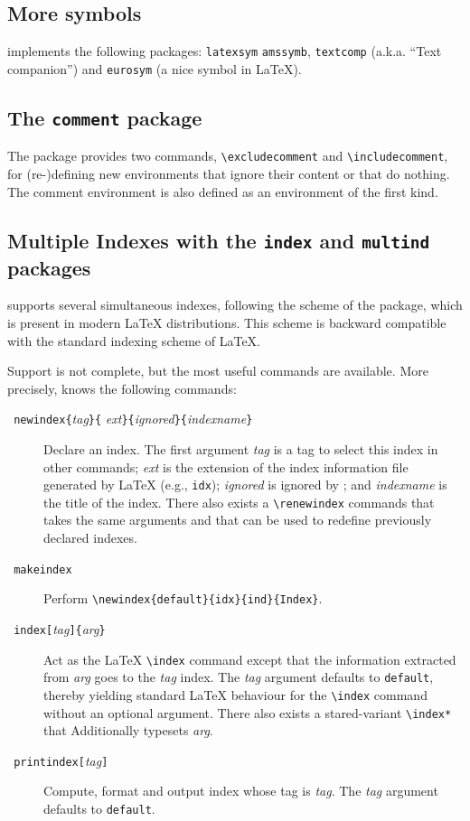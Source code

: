\subsection{More symbols}
\hevea{} implements the following packages: \texttt{latexsym}
\texttt{amssymb}, \texttt{textcomp} (a.k.a. ``Text companion'')
and \texttt{eurosym} (a nice \texteuro{} symbol in \LaTeX).


\subsection{The \texttt{comment}\label{commentpack} package}
%
The  package provides two commands,
\verb+\excludecomment+ and \verb+\includecomment+, for (re-)defining
new environments that ignore their content or that do nothing. The
comment environment is also defined as an environment of the first
kind.



\subsection{Multiple Indexes with the \texttt{index} and
\texttt{multind}\label{multind} packages}
%
\hevea{} supports several simultaneous indexes, following the scheme
of the
 package,
which is present in modern \LaTeX{} distributions.
This scheme is backward compatible with the standard indexing scheme
of \LaTeX.

Support is not complete, but the most useful commands are available.
More precisely, \hevea{} knows the following commands:
\begin{description}
\item[{\tt{} newindex\{}{\it tag}{\tt \}\{}{\it
ext}{\tt\}\{}{\it ignored}{\tt\}\{}{\it indexname}{\tt\}}]
Declare an index.
The first argument {\it tag} is a tag to select this index in other
commands; {\it ext} is the extension of the index information file
generated by \LaTeX{} (e.g., \texttt{idx}); {\it ignored} is ignored by
\hevea{}; and {\it indexname} is the title of the index.
There also exists a
\verb+\renewindex+ commands that takes the same arguments and that can be
used to redefine previously declared indexes.
\item[{\tt{} makeindex}] Perform
\verb+\newindex{default}{idx}{ind}{Index}+.
\item[{\tt{} index[}{\it tag}{\tt]\{}{\it arg}{\tt\}}]
Act as the \LaTeX{} \verb+\index+ command except that the information
extracted from {\it arg} goes to the {\it tag} index.
The {\it tag} argument defaults to \verb+default+, thereby yielding
standard \LaTeX{} behaviour for the \verb+\index+ command without an
optional argument.
There also exists a stared-variant \verb+\index*+ that Additionally
typesets {\it arg}.
\item[{\tt{} printindex[}{\it tag}{\tt]}] Compute, format and
output index whose tag is \textit{tag}. The {\it tag} argument
defaults to \verb+default+.
\end{description}

